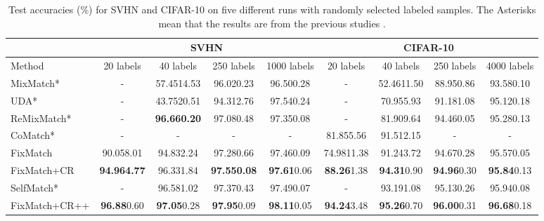 \documentclass[letterpaper]{article} \usepackage{aaai22}  \usepackage{times}  \usepackage{helvet}  \usepackage{courier}  \usepackage[hyphens]{url}  \usepackage{graphicx} \urlstyle{rm} \def\UrlFont{\rm}  \usepackage{natbib}  \usepackage{caption} \DeclareCaptionStyle{ruled}{labelfont=normalfont,labelsep=colon,strut=off} \frenchspacing  \setlength{\pdfpagewidth}{8.5in}  \setlength{\pdfpageheight}{11in}  \usepackage{algorithm}
\begin{document}
\begin{table*}[]
\centering
\footnotesize
\caption{Test accuracies (\%) for SVHN and CIFAR-10 on five different runs with randomly selected labeled samples. The Asterisks mean that the results are from the previous studies \cite{sohn2020fixmatch,li2020comatch,kim2021selfmatch}.}
\label{tab:cifar_acc}
\begin{tabular}{l|cccc|cccc}
\toprule
 & \multicolumn{4}{c|}{SVHN} & \multicolumn{4}{c}{CIFAR-10} \\ \hline
 Method & 20 labels & 40 labels & 250 labels & 1000 labels&  20 labels & 40 labels & 250 labels & 4000 labels       \\ \hline
 MixMatch*           &   - & 57.45\scriptsize{14.53} & 96.02\scriptsize{0.23} & 96.50\scriptsize{0.28} & -  &  52.46\scriptsize{11.50} & 88.95\scriptsize{0.86} & 93.58\scriptsize{0.10}  \\
 UDA*           &   - & 43.75\scriptsize{20.51} & 94.31\scriptsize{2.76} & 97.54\scriptsize{0.24} & -  &  70.95\scriptsize{5.93} & 91.18\scriptsize{1.08}  & 95.12\scriptsize{0.18} \\
 ReMixMatch*    &   -  & \textbf{96.66\scriptsize{0.20}} & 97.08\scriptsize{0.48} & 97.35\scriptsize{0.08} & - & 81.90\scriptsize{9.64} & 94.46\scriptsize{0.05} & 95.28\scriptsize{0.13}  \\ 
 CoMatch*    &   -  & - & - & - & 81.85\scriptsize{5.56} & 91.51\scriptsize{2.15} & -  & -  \\ \hline
 FixMatch    & 90.05\scriptsize{8.01} & 94.83\scriptsize{2.24} & 97.28\scriptsize{0.66} & 97.46\scriptsize{0.09} & 74.98\scriptsize{11.38}  & 91.24\scriptsize{3.72} & 94.67\scriptsize{0.28} &  95.57\scriptsize{0.05}\\
 FixMatch+CR   & \textbf{94.96\scriptsize{4.77}} & 96.33\scriptsize{1.84} & \textbf{97.55\scriptsize{0.08}} & \textbf{97.61}\scriptsize{0.06} & \textbf{88.26}\scriptsize{1.38} & \textbf{94.31}\scriptsize{0.90} & \textbf{94.96}\scriptsize{0.30} & \textbf{95.84}\scriptsize{0.13}\\ \hline
 SelfMatch*    &   -  & 96.58\scriptsize{1.02} & 97.37\scriptsize{0.43} & 97.49\scriptsize{0.07} & - & 93.19\scriptsize{1.08} & 95.13\scriptsize{0.26} & 95.94\scriptsize{0.08}  \\ 
 FixMatch+CR++   & \textbf{96.88}\scriptsize{0.60} & \textbf{97.05}\scriptsize{0.28} & \textbf{97.95}\scriptsize{0.09} & \textbf{98.11}\scriptsize{0.05}& \textbf{94.24}\scriptsize{3.48} & \textbf{95.26}\scriptsize{0.70} & \textbf{96.00}\scriptsize{0.31} & \textbf{96.68}\scriptsize{0.18}\\
\bottomrule
\end{tabular}
\end{table*}
\end{document}
